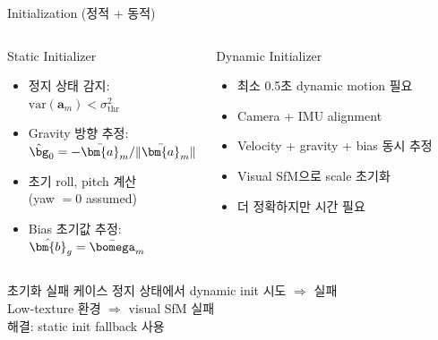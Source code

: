 \begin{frame}[shrink=10]{Initialization (정적 + 동적)}
  \begin{columns}[T]
      \begin{block}{Static Initializer}
        \begin{itemize}
          \item 정지 상태 감지:\\
            $\text{var}(\bm{a}_m) < \sigma_{\text{thr}}^2$
          \item Gravity 방향 추정:\\
            $\hat{\bg}_0 = -\bar{\bm{a}}_m / \|\bar{\bm{a}}_m\|$
          \item 초기 roll, pitch 계산\\
            (yaw $= 0$ assumed)
          \item Bias 초기값 추정:\\
            $\hat{\bm{b}}_g = \bar{\bomega}_m$
        \end{itemize}
      \end{block}
      \begin{block}{Dynamic Initializer}
        \begin{itemize}
          \item 최소 0.5초 dynamic motion 필요
          \item Camera + IMU alignment
          \item Velocity + gravity + bias 동시 추정
          \item Visual SfM으로 scale 초기화
          \item 더 정확하지만 시간 필요
        \end{itemize}
      \end{block}
  \end{columns}
  \vspace{0.3em}
  \begin{alertblock}{초기화 실패 케이스}
    정지 상태에서 dynamic init 시도 $\Rightarrow$ 실패\\
    Low-texture 환경 $\Rightarrow$ visual SfM 실패\\
    해결: static init fallback 사용
  \end{alertblock}
\end{frame}



